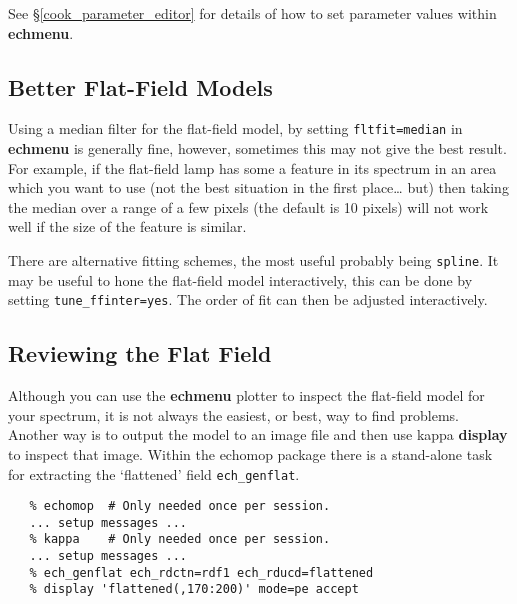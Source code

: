 \documentclass[twoside,11pt]{article}
\newcommand{\htmlref}[2]{#1}
\newcommand{\xref}[3]{#1}
\newcommand{\xlabel}[1]{}
\newcommand{\mlabel}[1]{\xlabel{#1}\label{#1}}
\newcommand{\scspec}[2]{#1}
\newcommand{\scspec}[2]{#2}
\begin{document}
See \scspec{\S\ref{cook_parameter_editor}}
{\htmlref{How to Use the {\bf echmenu} Parameter Editor}
{cook_parameter_editor}} for details of how to set parameter values within
{\bf echmenu}\@.


\subsection{\mlabel{cook_better_flat_fields}Better Flat-Field Models}

Using a median filter for the flat-field model, by setting
\xref{{\tt{fltfit=median}}}{sun152}{par_FLTFIT} in
\xref{{\bf echmenu}}{sun152}{ECHMENU} is generally fine, however,
sometimes this may not give the best result.
For example, if the flat-field lamp has some a feature in its spectrum in an
area which you want to use (not the best situation in the first place\ldots
but) then taking the median over a range of a few pixels (the default
is 10 pixels) will not work well if the size of the feature is similar.

There are alternative fitting schemes, the most useful probably being
\verb+spline+\@.
It may be useful to hone the flat-field model interactively, this can be
done by setting \xref{{\tt tune\_ffinter=yes}}{sun152}{par_TUNE_FFINTER}\@.
The order of fit can then be adjusted interactively.


\subsection{\mlabel{cook_reviewing_flat}Reviewing the Flat Field}

Although you can use the
\xref{{\bf echmenu}}{sun152}{ECHMENU}
\xref{plotter}{sun152}{option27} to inspect the flat-field model for
your spectrum, it is not always the easiest, or best, way to find
problems.  Another way is to output the model to an image file and then
use \xref{{\sc kappa}}{sun95}{} \xref{{\bf display}}{sun95}{DISPLAY}
to inspect that image.  Within the \xref{{\sc echomop}}{sun152}{}
package there is a stand-alone task for extracting the `flattened' field
\xref{{\tt ech\_genflat}}{sun152}{option30}\@.

{
\scspec{\small}{ }
\begin{verbatim}
   % echomop  # Only needed once per session.
   ... setup messages ...
   % kappa    # Only needed once per session.
   ... setup messages ...
   % ech_genflat ech_rdctn=rdf1 ech_rducd=flattened
   % display 'flattened(,170:200)' mode=pe accept
\end{verbatim}
}
\end{document}
